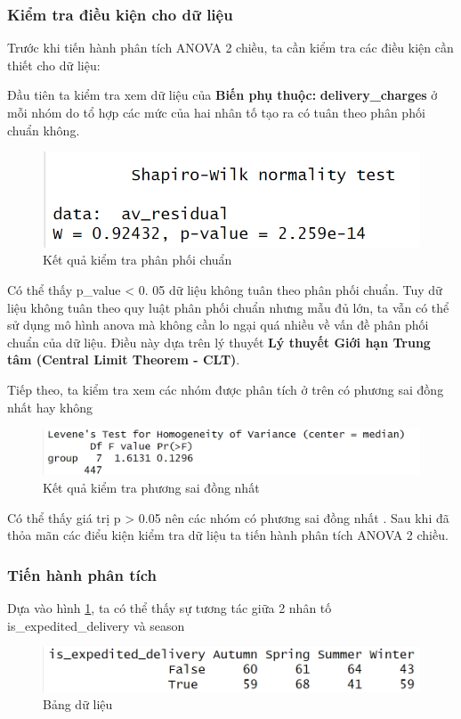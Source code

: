 \subsubsection{Kiểm tra điều kiện cho dữ liệu}
Trước khi tiến hành phân tích ANOVA 2 chiều, ta cần kiểm tra các điều kiện cần thiết cho dữ liệu:


 Đầu tiên ta kiểm tra xem dữ liệu của \textbf{Biến phụ thuộc:} \textbf{delivery\_charges} ở mỗi nhóm do tổ hợp các mức của hai nhân tố tạo ra có tuân theo phân phối chuẩn không.
 \begin{figure}[!htbp]
    \centering
    \includegraphics[width=0.7\linewidth]{graphics/5.4.1 (2).png}
    \caption{Kết quả kiểm tra phân phối chuẩn}
\end{figure}
\FloatBarrier

Có thể thấy p\_value < 0. 05 dữ liệu không tuân theo phân phối chuẩn.
Tuy dữ liệu không tuân theo quy luật phân phối chuẩn nhưng mẫu đủ lớn, ta vẫn có thể sử dụng mô hình anova mà không cần lo ngại quá nhiều về vấn đề phân phối chuẩn của dữ liệu. Điều này dựa trên lý thuyết \textbf{Lý thuyết Giới hạn Trung tâm (Central Limit Theorem - CLT)}. 


   Tiếp theo, ta kiểm tra xem các nhóm được phân tích ở trên có phương sai đồng nhất hay không 

   \begin{figure}[!htbp]
    \centering
    \includegraphics[width=0.7\linewidth]{graphics/5.4.2.png}
    \caption{Kết quả kiểm tra phương sai đồng nhất}
\end{figure}

Có thể thấy giá trị p > 0.05 nên các nhóm có phương sai đồng nhất . 
Sau khi đã thỏa mãn các điểu kiện kiểm tra dữ liệu ta tiến hành phân tích ANOVA 2 chiều.

\subsubsection{Tiến hành phân tích}


Dựa vào hình \ref{fig:5.5}, ta có thể thấy sự tương tác giữa 2 nhân tố is\_expedited\_delivery và season
\begin{figure}[!htbp]
    \centering
    \includegraphics[width=1\linewidth]{graphics/5.4.3.png}
    \caption{Bảng dữ liệu}
    \label{fig:5.5}
\end{figure}

